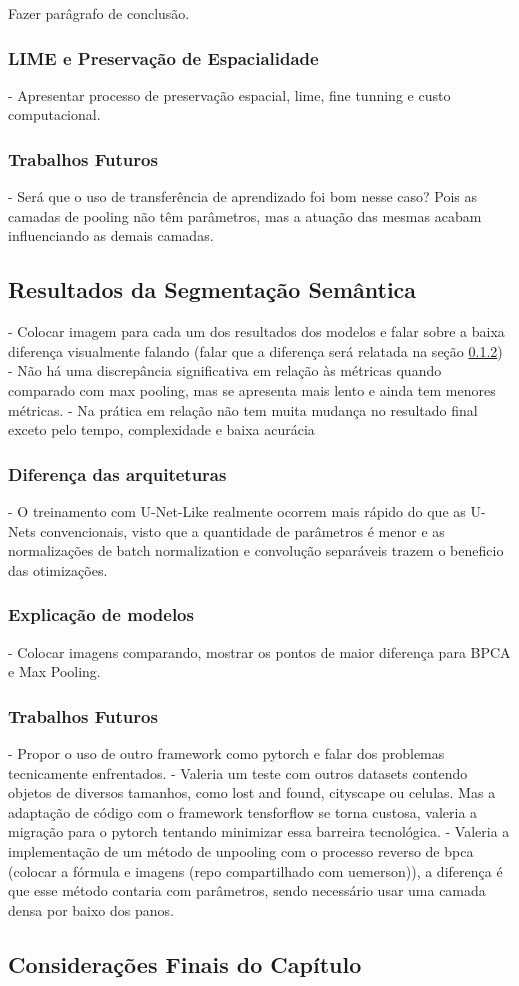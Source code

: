 Fazer parâgrafo de conclusão.

\subsubsection{LIME e Preservação de Espacialidade}
\label{results:class:lime}
- Apresentar processo de preservação espacial, lime, fine tunning e custo computacional.

\subsubsection{Trabalhos Futuros}
\label{results:class:future}
- Será que o uso de transferência de aprendizado foi bom nesse caso? Pois as camadas de pooling não têm parâmetros, mas a atuação das mesmas acabam influenciando as demais camadas.

\subsection{Resultados da Segmentação Semântica}
\label{results:semantic}
- Colocar imagem para cada um dos resultados dos modelos e falar sobre a baixa diferença visualmente falando (falar que a diferença será relatada na seção \ref{results:semantic:xai})
- Não há uma discrepância significativa em relação às métricas quando comparado com max pooling, mas se apresenta mais lento e ainda tem menores métricas.
- Na prática em relação não tem muita mudança no resultado final exceto pelo tempo, complexidade e baixa acurácia

\subsubsection{Diferença das arquiteturas}
\label{results:semantic:arch}
- O treinamento com U-Net-Like realmente ocorrem mais rápido do que as U-Nets convencionais, visto que a quantidade de parâmetros é menor e as normalizações de batch normalization e convolução separáveis trazem o beneficio das otimizações.

\subsubsection{Explicação de modelos}
\label{results:semantic:xai}
- Colocar imagens comparando, mostrar os pontos de maior diferença para BPCA e Max Pooling.

\subsubsection{Trabalhos Futuros}
\label{results:semantic:future}
- Propor o uso de outro framework como pytorch e falar dos problemas tecnicamente enfrentados.
- Valeria um teste com outros datasets contendo objetos de diversos tamanhos, como lost and found, cityscape ou celulas. Mas a adaptação de código com o framework tensforflow se torna custosa, valeria a migração para o pytorch tentando minimizar essa barreira tecnológica.
- Valeria a implementação de um método de unpooling com o processo reverso de bpca (colocar a fórmula e imagens (repo compartilhado com uemerson)), a diferença é que esse método contaria com parâmetros, sendo necessário usar uma camada densa por baixo dos panos.


\subsection{Considerações Finais do Capítulo}
\label{result:final}
